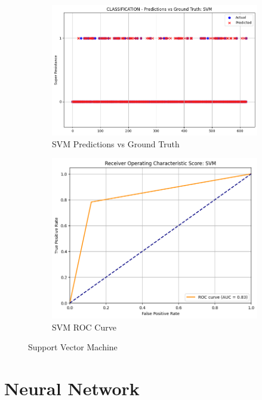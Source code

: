 \documentclass[manuscript,screen,review, nonacm]{acmart}
\begin{document}
\begin{figure}[H]
    \centering
    \begin{subfigure}{0.45\textwidth}
        \includegraphics[width=\linewidth]{figs/svm1.png}
        \caption{SVM Predictions vs Ground Truth}
    \end{subfigure}
    \hfill
    \begin{subfigure}{0.45\textwidth}
        \includegraphics[width=\linewidth]{figs/svm2.png}
        \caption{SVM ROC Curve}
    \end{subfigure}
    \caption{Support Vector Machine}
\end{figure}

\section*{Neural Network}
\end{document}
